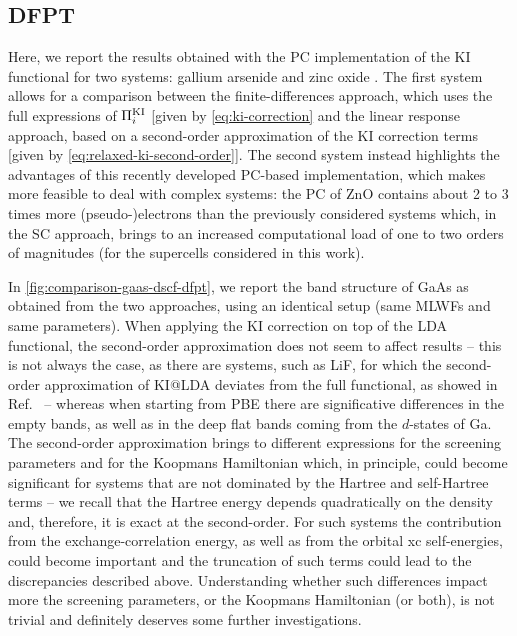 \subsection{DFPT\label{sec:results-dfpt}}
Here, we report the results obtained with the PC implementation of the KI functional for two systems: gallium arsenide and zinc oxide \cite{colonna_koopmans_2022}. The first system allows for a comparison between the finite-differences approach, which uses the full expressions of $\Pi_i^{\rm KI}$ [given by \cref{eq:ki-correction} and the linear response approach, based on a second-order approximation of the KI correction terms [given by \cref{eq:relaxed-ki-second-order}]. The second system instead highlights the advantages of this recently developed PC-based implementation, which makes more feasible to deal with complex systems: the PC of ZnO contains about 2 to 3 times more (pseudo-)electrons than the previously considered systems which, in the SC approach, brings to an increased computational load of one to two orders of magnitudes (for the supercells considered in this work).

In \cref{fig:comparison-gaas-dscf-dfpt}, we report the band structure of GaAs as obtained from the two approaches, using an identical setup (same MLWFs and same parameters). When applying the KI correction on top of the LDA functional, the second-order approximation does not seem to affect results -- this is not always the case, as there are systems, such as LiF, for which the second-order approximation of KI@LDA deviates from the full functional, as showed in Ref.~\cite{colonna_koopmans_2022} -- whereas when starting from PBE there are significative differences in the empty bands, as well as in the deep flat bands coming from the $d$-states of Ga. The second-order approximation brings to different expressions for the screening parameters and for the Koopmans Hamiltonian which, in principle, could become significant for systems that are not dominated by the Hartree and self-Hartree terms -- we recall that the Hartree energy depends quadratically on the density and, therefore, it is exact at the second-order. For such systems the contribution from the exchange-correlation energy, as well as from the orbital xc self-energies, could become important and the truncation of such terms could lead to the discrepancies described above. Understanding whether such differences impact more the screening parameters, or the Koopmans Hamiltonian (or both), is not trivial and definitely deserves some further investigations.

